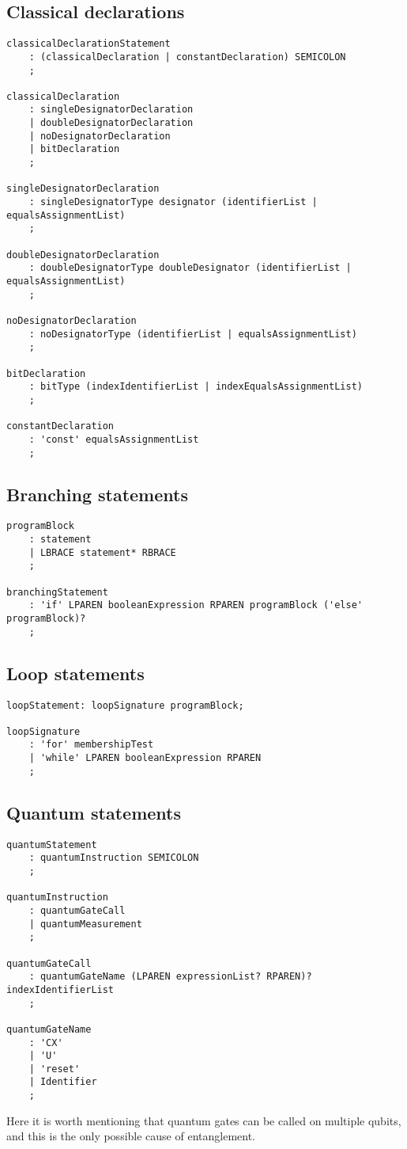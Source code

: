 \documentclass[12pt,a4paper]{report}
\theoremstyle{definition}
\theoremstyle{definition}
\theoremstyle{definition}
\begin{document}
\subsection{Classical declarations}
\begin{lstlisting}
classicalDeclarationStatement
    : (classicalDeclaration | constantDeclaration) SEMICOLON
    ;

classicalDeclaration
    : singleDesignatorDeclaration
    | doubleDesignatorDeclaration
    | noDesignatorDeclaration
    | bitDeclaration
    ;

singleDesignatorDeclaration
    : singleDesignatorType designator (identifierList | equalsAssignmentList)
    ;

doubleDesignatorDeclaration
    : doubleDesignatorType doubleDesignator (identifierList | equalsAssignmentList)
    ;

noDesignatorDeclaration
    : noDesignatorType (identifierList | equalsAssignmentList)
    ;

bitDeclaration
    : bitType (indexIdentifierList | indexEqualsAssignmentList)
    ;

constantDeclaration
    : 'const' equalsAssignmentList
    ;
\end{lstlisting}

\subsection{Branching statements}
\begin{lstlisting}
programBlock
    : statement
    | LBRACE statement* RBRACE
    ;

branchingStatement
    : 'if' LPAREN booleanExpression RPAREN programBlock ('else' programBlock)?
    ;
\end{lstlisting}


\subsection{Loop statements}
\begin{lstlisting}
loopStatement: loopSignature programBlock;

loopSignature
    : 'for' membershipTest
    | 'while' LPAREN booleanExpression RPAREN
    ;
\end{lstlisting}


\subsection{Quantum statements}
\begin{lstlisting}
quantumStatement
    : quantumInstruction SEMICOLON
    ;

quantumInstruction
    : quantumGateCall
    | quantumMeasurement
    ;

quantumGateCall
    : quantumGateName (LPAREN expressionList? RPAREN)? indexIdentifierList
    ;

quantumGateName
    : 'CX'
    | 'U'
    | 'reset'
    | Identifier
    ;
\end{lstlisting}
Here it is worth mentioning that quantum gates can be called on multiple qubits, and this is the only possible cause of entanglement.\\
\end{document}
